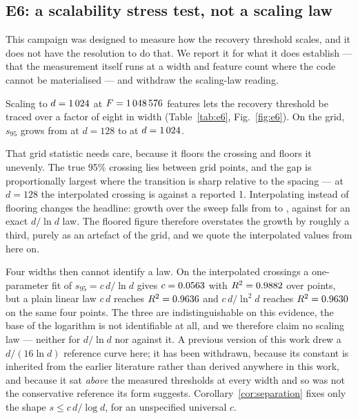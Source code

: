 \subsection{E6: a scalability stress test, not a scaling law}
\label{sec:res-e6}

This campaign was designed to measure how the recovery threshold scales, and it does not have
the resolution to do that. We report it for what it does establish --- that the measurement
itself runs at a width and feature count where the code cannot be materialised --- and withdraw
the scaling-law reading.

Scaling to $d=1\,024$ at $F=1\,048\,576$ features lets the recovery threshold be traced over
a factor of eight in width (Table~\ref{tab:e6}, Fig.~\ref{fig:e6}). On the grid, $s_{95}$ grows
from \EsixOneTwoEightSNF{} at $d=128$ to \EsixOneZeroTwoFourSNF{} at $d=1\,024$.

That grid statistic needs care, because it floors the crossing and floors it unevenly. The
true 95\% crossing lies between grid points, and the gap is proportionally largest where the
transition is sharp relative to the spacing --- at $d=128$ the interpolated crossing is
\EsixInterpOneTwoEight{} against a reported 1. Interpolating instead of flooring changes the
headline: growth over the sweep falls from \EsixGrowthGrid{} to \EsixGrowthInterp, against
\EsixGrowthPredicted{} for an exact $d/\ln d$ law. The floored figure therefore overstates the
growth by roughly a third, purely as an artefact of the grid, and we quote the interpolated
values from here on.

Four widths then cannot identify a law. On the interpolated crossings a one-parameter fit of
$s_{95}=c\,d/\ln d$ gives $c=0.0563$ with $R^2=0.9882$ over
\EsixFitPoints{} points, but a plain linear law $c\,d$ reaches $R^2=0.9636$ and
$c\,d/\ln^2 d$ reaches $R^2=0.9630$ on the same four points. The three are
indistinguishable on this evidence, the base of the logarithm is not identifiable at all, and we
therefore claim no scaling law --- neither for $d/\ln d$ nor against it. A previous version of
this work drew a $d/(16\ln d)$ reference curve here; it has been withdrawn, because its constant
is inherited from the earlier literature rather than derived anywhere in this work, and because
it sat \emph{above} the measured thresholds at every width and so was not the conservative
reference its form suggests. Corollary~\ref{cor:separation} fixes only the shape
$s\le c\,d/\log d$, for an unspecified universal $c$.

